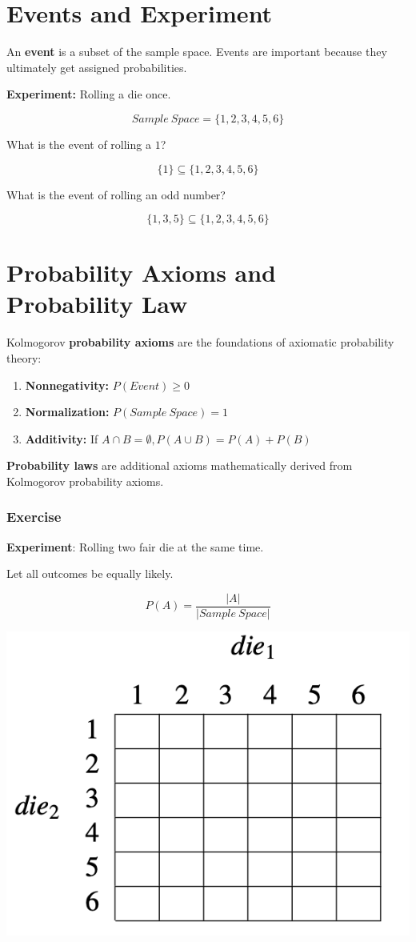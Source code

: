 \documentclass[
  letterpaper,
  DIV=11,
  numbers=noendperiod]{scrreprt}
\providecommand{\tightlist}{%
  \setlength{\itemsep}{0pt}\setlength{\parskip}{0pt}}\usepackage{longtable,booktabs,array}
\begin{document}
\section{Events and Experiment}\label{events-and-experiment}

An \textbf{event} is a subset of the sample space. Events are important
because they ultimately get assigned probabilities.

\textbf{Experiment:} Rolling a die once.

\[ 
Sample \ Space = \{1,2,3,4,5,6\}
\]

What is the event of rolling a \(1\)?

\[
\{1\} \subseteq \{1,2,3,4,5,6\}
\]

What is the event of rolling an odd number?

\[
\{1, 3, 5\} \subseteq \{1,2,3,4,5,6\}
\]

\section{Probability Axioms and Probability
Law}\label{probability-axioms-and-probability-law}

Kolmogorov \textbf{probability axioms} are the foundations of axiomatic
probability theory:

\begin{enumerate}
\def\labelenumi{\arabic{enumi}.}
\tightlist
\item
  \textbf{Nonnegativity:} \(P(Event) \geq 0\)
\item
  \textbf{Normalization:} \(P(Sample\ Space) = 1\)
\item
  \textbf{Additivity:} If
  \(A \cap B = \emptyset, P(A \cup B) = P(A) + P(B)\)
\end{enumerate}

\textbf{Probability laws} are additional axioms mathematically derived
from Kolmogorov probability axioms.

\subsubsection{Exercise}\label{exercise-4}

\textbf{Experiment}: Rolling two fair die at the same time.

Let all outcomes be equally likely.

\[ 
P(A) = \frac{|A|}{|Sample\ Space|}
\]

\includegraphics[width=0.3\linewidth,height=\textheight,keepaspectratio]{lecture2/images/discrete-axiomatic.png}
\end{document}
